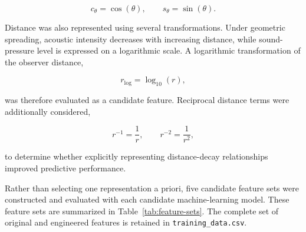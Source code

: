 \documentclass[11pt]{article}
\begin{document}
\begin{equation}
    c_{\theta} = \cos(\theta),
    \qquad
    s_{\theta} = \sin(\theta).
\end{equation}

Distance was also represented using several transformations. Under geometric spreading, acoustic intensity decreases with increasing distance, while sound-pressure level is expressed on a logarithmic scale. A logarithmic transformation of the observer distance,

\begin{equation}
    r_{\log} = \log_{10}(r),
\end{equation}

was therefore evaluated as a candidate feature. Reciprocal distance terms were additionally considered,

\begin{equation}
    r^{-1} = \frac{1}{r},
    \qquad
    r^{-2} = \frac{1}{r^2},
\end{equation}

to determine whether explicitly representing distance-decay relationships improved predictive performance.

Rather than selecting one representation a priori, five candidate feature sets were constructed and evaluated with each candidate machine-learning model. These feature sets are summarized in Table~\ref{tab:feature-sets}. The complete set of original and engineered features is retained in \texttt{training\_data.csv}.
\end{document}
